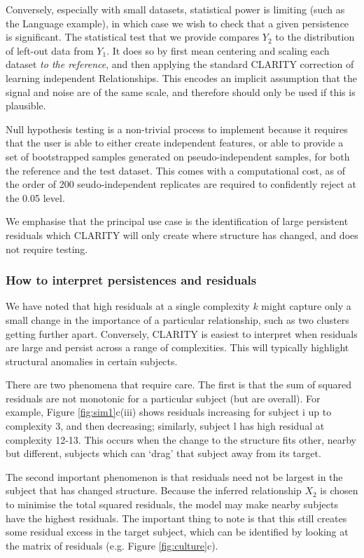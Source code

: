 \documentclass[a4]{article}
\newcommand{\+}[1]{\mathbf{#1}}
\begin{document}
Conversely, especially with small datasets, statistical power is limiting (such as the Language example), in which case we wish to check that a given persistence is significant. The statistical test that we provide compares $Y_2$ to the distribution of left-out data from $Y_1$. It does so by first mean centering and scaling each dataset \emph{to the reference}, and then applying the standard CLARITY correction of learning independent Relationships. This encodes an implicit assumption that the signal and noise are of the same scale, and therefore should only be used if this is plausible.

Null hypothesis testing is a non-trivial process to implement because it requires that the user is able to either create independent features, or able to provide a set of bootstrapped samples generated on pseudo-independent samples, for both the reference and the test dataset. This comes with a computational cost, as of the order of 200 seudo-independent replicates are required to confidently reject at the 0.05 level.

We emphasise that the principal use case is the identification of large persistent residuals which CLARITY will only create where structure has changed, and does not require testing.

\subsubsection{How to interpret persistences and residuals}

We have noted that high residuals at a single complexity $k$ might capture only a small change in the importance of a particular relationship, such as two clusters getting further apart. Conversely, CLARITY is easiest to interpret when residuals are large and persist across a range of complexities. This will typically highlight structural anomalies in certain subjects.

There are two phenomena that require care. The first is that  the sum of squared residuals are not monotonic for a particular subject (but are overall). For example, Figure \ref{fig:sim1}c(iii) shows residuals increasing for subject i up to complexity 3, and then decreasing; similarly, subject l has high residual at complexity 12-13. This occurs when the change to the structure fits other, nearby but different, subjects which can `drag' that subject away from its target.

The second important phenomenon is that residuals need not be largest in the subject that has changed structure. Because the inferred relationship $X_2$ is chosen to minimise the total squared residuals, the model may make nearby subjects have the highest residuals. The important thing to note is that this still creates some residual excess in the target subject, which can be identified by looking at the matrix of residuals (e.g. Figure \ref{fig:culture}c).
\end{document}
